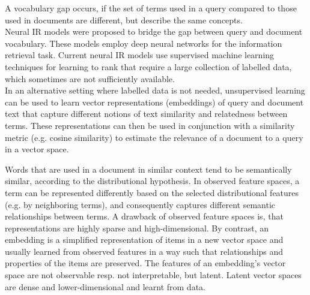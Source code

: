 A vocabulary gap occurs, if the set of terms used in a query compared to those used in documents are different, but describe the same concepts. \cite{van-gysel:2017:neural-vector-spaces}
\\Neural IR models were proposed to bridge the gap between query and document vocabulary.
These models employ deep neural networks for the information retrieval task.
Current neural IR models use supervised machine learning techniques for learning to rank that require a large collection of labelled data, which sometimes are not sufficiently available.
\\In an alternative setting where labelled data is not needed, unsupervised learning can be used to learn vector representations (embeddings) of query and document text that capture different notions of text similarity and relatedness between terms.
These representations can then be used in conjunction with a similarity metric (e.g. cosine similarity) to estimate the relevance of a document to a query in a vector space. \cite{mitra:2018:introduction-neural-ir}

Words that are used in a document in similar context tend to be semantically similar, according to the distributional hypothesis.
In observed feature spaces, a term can be represented differently based on the selected distributional features (e.g. by neighboring terms), and consequently captures different semantic relationships between terms.
A drawback of observed feature spaces is, that representations are highly sparse and high-dimensional.
By contrast, an embedding is a simplified representation of items in a new vector space and usually learned from observed features in a way such that relationships and properties of the items are preserved.
The features of an embedding’s vector space are not observable resp. not interpretable, but latent.
Latent vector spaces are dense and lower-dimensional and learnt from data. \cite{mitra:2018:introduction-neural-ir}


